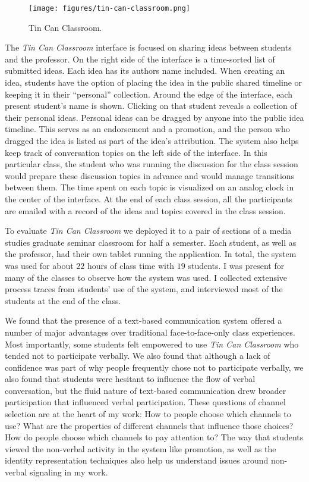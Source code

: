 \documentclass{tufte-handout}
\begin{document}
\begin{figure}[t]
	\texttt{[image: figures/tin-can-classroom.png]}
	\caption{Tin Can Classroom.}
	\label{fig:tin-can-clasroom}
\end{figure}


The \emph{Tin Can Classroom} interface is focused on sharing ideas between students and the professor. On the right side of the interface is a time-sorted list of submitted ideas. Each idea has its authors name included. When creating an idea, students have the option of placing the idea in the public shared timeline or keeping it in their ``personal'' collection. Around the edge of the interface, each present student's name is shown. Clicking on that student reveals a collection of their personal ideas. Personal ideas can be dragged by anyone into the public idea timeline. This serves as an endorsement and a promotion, and the person who dragged the idea is listed as part of the idea's attribution. The system also helps keep track of conversation topics on the left side of the interface. In this particular class, the student who was running the discussion for the class session would prepare these discussion topics in advance and would manage transitions between them. The time spent on each topic is visualized on an analog clock in the center of the interface. At the end of each class session, all the participants are emailed with a record of the ideas and topics covered in the class session.

To evaluate \emph{Tin Can Classroom} we deployed it to a pair of sections of a media studies graduate seminar classroom for half a semester. Each student, as well as the professor, had their own tablet running the application. In total, the system was used for about $22$ hours of class time with $19$ students. I was present for many of the classes to observe how the system was used. I collected extensive process traces from students' use of the system, and interviewed most of the students at the end of the class.

We found that the presence of a text-based communication system offered a number of major advantages over traditional face-to-face-only class experiences. Most importantly, some students felt empowered to use \emph{Tin Can Classroom} who tended not to participate verbally. We also found that although a lack of confidence was part of why people frequently chose not to participate verbally, we also found that students were hesitant to influence the flow of verbal conversation, but the fluid nature of text-based communication drew broader participation that influenced verbal participation. These questions of channel selection are at the heart of my work: How to people choose which channels to use? What are the properties of different channels that influence those choices? How do people choose which channels to pay attention to? The way that students viewed the non-verbal activity in the system like promotion, as well as the identity representation techniques also help us understand issues around non-verbal signaling in my work.
\end{document}
